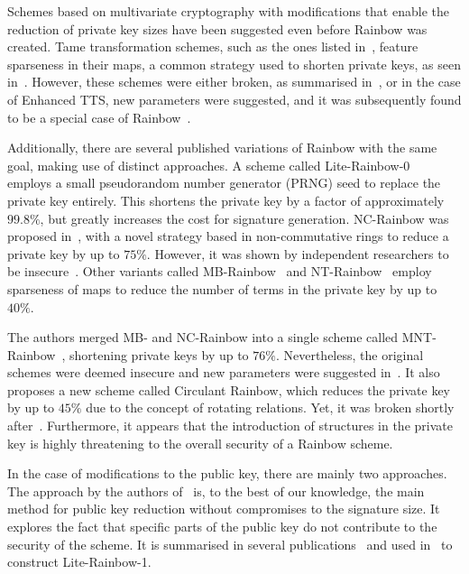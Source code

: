 \documentclass[openright, draft, 10pt]{report}
\begin{document}
Schemes based on multivariate cryptography with modifications that enable the
reduction of private key sizes have been suggested even before Rainbow was
created. Tame transformation schemes, such as the ones listed
in~\cite{Wolf:200503:misc}, feature sparseness in their maps, a common
strategy used to shorten private keys, as seen in~\cite{Yang:200604:inproc}.
However, these schemes were either broken, as summarised
in~\cite{Ding:200604:article}, or in the case of Enhanced TTS, new parameters
were suggested, and it was subsequently found to be a special case of
Rainbow~\cite{Thomae:201207:inproc}.

Additionally, there are several published variations of Rainbow with the
same goal, making use of distinct approaches. A scheme called
Lite-Rainbow-0~\cite{Shim:201512:inproc} employs a small pseudorandom
number generator (PRNG) seed to replace the private key entirely. This shortens
the private key by a factor of approximately $99.8\%$, but greatly increases
the cost for signature generation. NC-Rainbow was proposed
in~\cite{Yasuda:201202:inproc}, with a novel strategy based in non-commutative
rings to reduce a private key by up to $75\%$. However, it was shown by
independent researchers to be
insecure~\cite{Thomae:201209:inproc,Hashimoto:201302:inproc}. Other variants
called MB-Rainbow~\cite{Yasuda:201305:inproc} and
NT-Rainbow~\cite{Yasuda:201404:inproc} employ sparseness of maps to reduce the
number of terms in the private key by up to $40\%$.

The authors merged MB- and NC-Rainbow into a single scheme called
MNT-Rainbow~\cite{Yasuda:201409:article}, shortening private keys by up to
$76\%$. Nevertheless, the original schemes were deemed insecure and new
parameters were suggested in~\cite{Peng:201706:article}. It also proposes a new
scheme called Circulant Rainbow, which reduces the private key by up to $45\%$
due to the concept of rotating relations. Yet, it was broken shortly
after~\cite{Hashimoto:201810:misc}. Furthermore, it appears that the introduction
of structures in the private key is highly threatening to the overall security 
of a Rainbow scheme.

In the case of modifications to the public key, there are mainly two approaches.
The approach by the authors of~\cite{Petzoldt:201006:inproc} is, to the best of 
our knowledge, the main method for public key reduction without compromises to
the signature size. It explores the fact that specific parts of the public key
do not contribute to the security of the scheme. It is summarised in several
publications~\cite{Petzoldt:201012:inproc,Petzoldt:201103:inproc,Petzoldt:201211:inproc,Petzoldt:201307:phd}
and used in~\cite{Shim:201512:inproc} to construct Lite-Rainbow-1.
\end{document}
